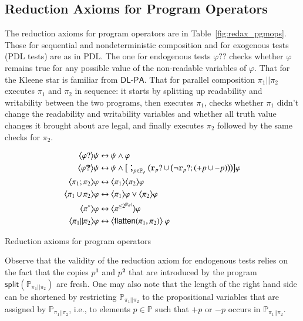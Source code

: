 \documentclass{llncs}
\newcommand{\progsplit}{\mathsf{split}}
\newcommand{\progFlatten}{\mathsf{flatten}}
\newcommand{\atm}{x}
\newcommand{\cp}[2]{{#2}^\mathbf{#1}}
\newcommand{\pll}{ {||} }							%
\newcommand{\readable}[1]{\mathtt{r}_{#1}}
\newcommand{\testendo}{?\!\!?}			%
\newcommand{\testpdl}{?}				%
\newcommand{\Dlpa}{\ensuremath{\mathsf{DL\text{-}PA}}\xspace}
\newcommand{\assgntopV}[1]{{\mathtt {+} #1}}
\newcommand{\assgnbotV}[1]{{\mathtt {-} #1}}
\newcommand{\card}[1]{|#1|}
\newcommand{\lbox}[1]{ \big[ #1 \big] }
\newcommand{\ldia}[1]{ \big\langle #1 \big\rangle}
\newcommand{\leqv}{ \leftrightarrow }
\newcommand{\ndet}{\,{\cup}\,}
\renewcommand{\phi}{\varphi}
\newcommand{\propset}{\mathbb P}
\newcommand{\propsetOf}[1]{\propset_{#1}}
\newcommand{\seqseq}[1]{ \text{\Large ;}_{#1} ~ }
\begin{document}
\subsection{Reduction Axioms for Program Operators}\label{sec:redax_pgmop} 

The reduction axioms for program operators are in Table~\ref{fig:redax_pgmops}.
Those for sequential and nondeterministic composition and for exogenous tests (PDL tests) are as in PDL. 
The one for endogenous tests $ \phi \testendo$ 
checks whether $\phi$ remains true for any possible value of the non-readable variables of $\phi$. 
That for the Kleene star is familiar from \Dlpa. 
That for parallel composition $\pi_1 \pll \pi_2$ executes $\pi_1$ and $\pi_2$ in sequence:
it starts by splitting up readability and writability between the two programs,
then executes $\pi_1$, checks whether $\pi_1$ didn't change the readability and writability variables
and whether all truth value changes it brought about are legal, 
and finally executes $\pi_2$ followed by the same checks for $\pi_2$.

\begin{table}[t]
\begin{align*}
\ldia{\phi \testpdl } \psi \leqv &\ \psi \land \phi
\\
\ldia{\phi \testendo } \psi \leqv &\ \psi \land \lbox{ ~ \seqseq{p \in \propsetOf \phi} \big(
\readable{p} \testpdl \ndet \big( \lnot \readable{p} \testpdl ; (\assgntopV{p} \ndet \assgnbotV{p}) \big) 
\big) } \phi
\\
\ldia{\pi_1 ; \pi_2}  \phi \leqv &\ \ldia{\pi_1 } \ldia{\pi_2}  \phi 
\\
\ldia{\pi_1 \ndet \pi_2}  \phi \leqv &\ \ldia{\pi_1 } \phi \lor \ldia{\pi_2}  \phi 
\\
\ldia{\pi^\ast}  \phi \leqv &\ \ldia{\pi^{\leq 2^{\card{\propsetOf{\phi}}}} }  \phi   
\\
\ldia{\pi_1 \pll \pi_2}  \phi \leqv &\ \ldia{ \progFlatten(\pi_1, \pi_2) } ~ \phi 
\end{align*}
\caption{Reduction axioms for program operators
\label{fig:redax_pgmops}
}
\end{table}

Observe that the validity of the reduction axiom for endogenous tests relies on the fact that the copies  
$\cp 1 p$ and $\cp 2 p$ that are introduced by the program 
$\progsplit( \propsetOf{\pi_1 \pll \pi_2} ) $ are fresh. 
%
%
One may also note that the length of the right hand side can be shortened by restricting 
$\propsetOf{\pi_1 \pll \pi_2}$ to the propositional variables that are assigned by $\propsetOf{\pi_1 \pll \pi_2}$, i.e., 
to elements $p \in \propset$ such that $\assgntopV p$ or $\assgnbotV p$ occurs in $\propsetOf{\pi_1 \pll \pi_2}$.
\end{document}
